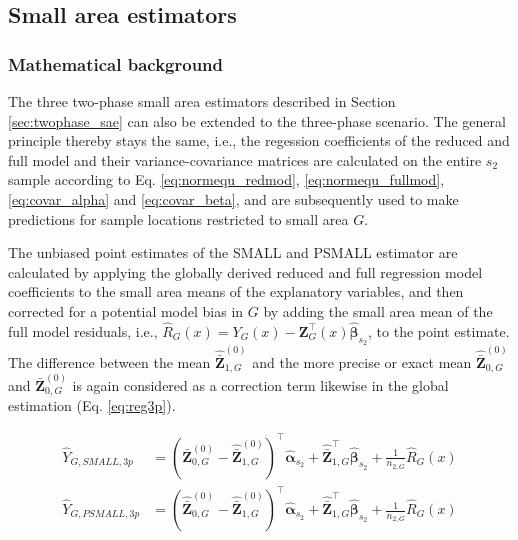 
\subsection{Small area estimators}
\label{sec:threephase_sae}

\subsubsection{Mathematical background}

The three two-phase small area estimators described in Section \ref{sec:twophase_sae} can also be extended to the three-phase scenario. The general principle thereby stays the same, i.e., the regession coefficients of the reduced and full model and their variance-covariance matrices are calculated on the entire $s_2$ sample according to Eq. \ref{eq:normequ_redmod}, \ref{eq:normequ_fullmod}, \ref{eq:covar_alpha} and \ref{eq:covar_beta}, and are subsequently used to make predictions for sample locations restricted to small area $G$.



The unbiased point estimates of the SMALL and PSMALL estimator are calculated by applying the globally derived reduced and full regression model coefficients to the small area means of the explanatory variables, and then corrected for a potential model bias in $G$ by adding the small area mean of the full model residuals, i.e., $\hat{R}_{G}(x)=Y_G(x)-\pmb{Z}_G^{\top}(x)\hat{\pmb{\beta}}_{s_2}$, to the point estimate. The difference between the mean $\hat{\bar{\pmb{Z}}}^{(0)}_{1,G}$ and the more precise or exact mean $\hat{\bar{\pmb{Z}}}^{(0)}_{0,G}$ and $\bar{\pmb{Z}}^{(0)}_{0,G}$ is again considered as a correction term likewise in the global estimation (Eq. \ref{eq:reg3p}).

\begin{subequations}\label{eq:pest_3p_small_psmall}
\begin{align}
\hat{Y}_{G,SMALL,3p}&=(\bar{\pmb{Z}}^{(0)}_{0,G}-\hat{\bar{\pmb{Z}}}^{(0)}_{1,G})^{\top}\hat{\pmb{\alpha}}_{s_2} +
\hat{\bar{\pmb{Z}}}^{\top}_{1,G}\hat{\pmb{\beta}}_{s_2}+\frac{1}{n_{2,G}}\hat{R}_{G}(x) \label{eq:pe_3p_small} \\
\hat{Y}_{G,PSMALL,3p}&=(\hat{\bar{\pmb{Z}}}^{(0)}_{0,G}-\hat{\bar{\pmb{Z}}}^{(0)}_{1,G})^{\top}\hat{\pmb{\alpha}}_{s_2} +
\hat{\bar{\pmb{Z}}}^{\top}_{1,G}\hat{\pmb{\beta}}_{s_2}+\frac{1}{n_{2,G}}\hat{R}_{G}(x) \label{eq:pe_3p_psmall}
\end{align}
\end{subequations}

